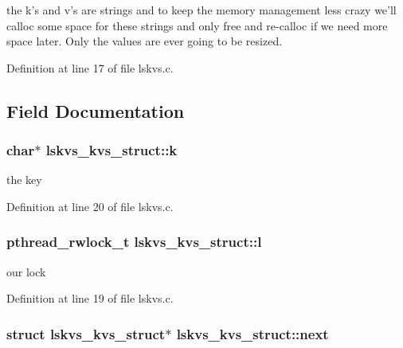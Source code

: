 the k's and v's are strings and to keep the memory management less crazy we'll calloc some space for these strings and only free and re-\/calloc if we need more space later. Only the values are ever going to be resized. 

Definition at line 17 of file lskvs.\-c.



\subsection{Field Documentation}
\hypertarget{structlskvs__kvs__struct_afaaab7729ce9dbabd8f3e2c502a8e4c5}{
\subsubsection[{k}]{\setlength{\rightskip}{0pt plus 5cm}char$\ast$ lskvs\-\_\-kvs\-\_\-struct\-::k}}\label{structlskvs__kvs__struct_afaaab7729ce9dbabd8f3e2c502a8e4c5}


the key 



Definition at line 20 of file lskvs.\-c.

\hypertarget{structlskvs__kvs__struct_a45129c7f3d0bb2efc83b8a0d7ea2d814}{
\subsubsection[{l}]{\setlength{\rightskip}{0pt plus 5cm}pthread\-\_\-rwlock\-\_\-t lskvs\-\_\-kvs\-\_\-struct\-::l}}\label{structlskvs__kvs__struct_a45129c7f3d0bb2efc83b8a0d7ea2d814}


our lock 



Definition at line 19 of file lskvs.\-c.

\hypertarget{structlskvs__kvs__struct_a6302f184418962708bd1efe3320d4347}{
\subsubsection[{next}]{\setlength{\rightskip}{0pt plus 5cm}struct {\bf lskvs\-\_\-kvs\-\_\-struct}$\ast$ lskvs\-\_\-kvs\-\_\-struct\-::next}}\label{structlskvs__kvs__struct_a6302f184418962708bd1efe3320d4347}


